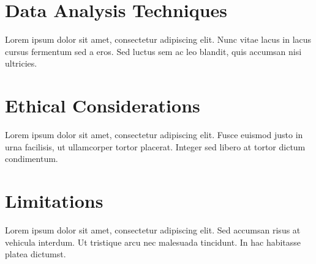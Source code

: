 \section{Data Analysis Techniques}
Lorem ipsum dolor sit amet, consectetur adipiscing elit. Nunc vitae lacus in lacus cursus fermentum sed a eros. Sed luctus sem ac leo blandit, quis accumsan nisi \cite{smith2020understanding}ultricies.

\section{Ethical Considerations}
Lorem ipsum dolor sit amet, consectetur adipiscing elit. Fusce euismod justo in urna facilisis,\cite{doe2021impact} ut ullamcorper tortor placerat. Integer sed libero at tortor dictum condimentum.

\section{Limitations}
Lorem ipsum dolor sit amet, consectetur adipiscing elit. Sed accumsan risus at vehicula interdum. Ut tristique arcu nec malesuada tincidunt. In hac habitasse platea dictumst.
